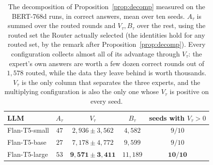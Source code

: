 \documentclass{article}
\theoremstyle{definition}
\theoremstyle{remark}
\theoremstyle{remark}
\begin{document}
\begin{table}[h]
\centering
\caption{The decomposition of Proposition~\ref{prop:decomp} measured on the
BERT-768d runs, in correct answers, mean over ten seeds. $A_\tau$ is summed
over the routed rounds and $V_\tau,B_\tau$ over the rest, using the routed set
the Router actually selected (the identities hold for any routed set, by the
remark after Proposition~\ref{prop:decomp}). Every configuration collects
almost all of its advantage through $V_\tau$: the expert's own answers are
worth a few dozen correct rounds out of $1{,}578$ routed, while the data they
leave behind is worth thousands. $V_\tau$ is the only column that separates
the three experts, and the multiplying configuration is also the only one whose
$V_\tau$ is positive on every seed.}
\label{tab:amazon-decomp}
\small
\begin{tabular}{@{}lcccc@{}}
\toprule
LLM & $A_\tau$ & $V_\tau$ & $B_\tau$ & seeds with $V_\tau>0$ \\
\midrule
Flan-T5-small  & $47$ & $2{,}936\pm3{,}562$ & $4{,}582$ & $9/10$ \\
Flan-T5-base   & $27$ & $7{,}178\pm4{,}772$ & $9{,}599$ & $9/10$ \\
Flan-T5-large  & $53$ & $\mathbf{9{,}571\pm3{,}411}$ & $11{,}189$ & $\mathbf{10/10}$ \\
\bottomrule
\end{tabular}
\end{table}
\end{document}
